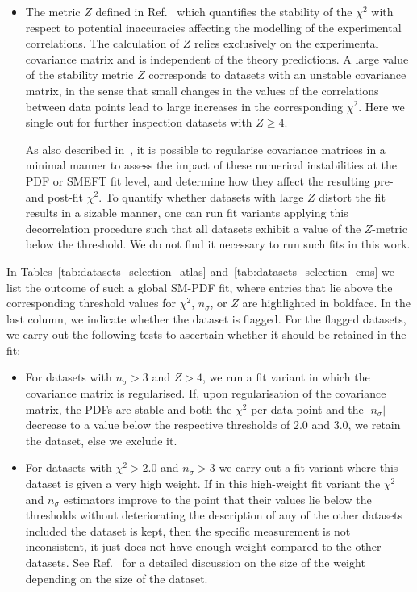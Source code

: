 \documentclass[withindex,glossary]{cam-thesis}
\begin{document}
\begin{itemize}
%
\item The metric $Z$ defined in Ref.~\cite{Kassabov:2022pps} which
quantifies the stability of the $\chi^2$ with respect
to potential inaccuracies affecting the modelling of the experimental correlations.
%
The calculation of $Z$ relies  exclusively on the experimental covariance matrix
and is independent of the theory predictions.
%
A large value of the stability metric $Z$ corresponds to
datasets with an unstable covariance matrix, in the sense that small changes
in the values of the correlations between data points lead to large
increases in the corresponding $\chi^2$.
%
Here we single out for further inspection  datasets with $Z\ge 4$.

As also described in~\cite{Kassabov:2022pps}, it is possible to regularise
covariance matrices in a minimal manner to assess the impact of these numerical
instabilities at the PDF or SMEFT fit level, and determine how
they affect the resulting pre- and post-fit $\chi^2$.
%
To quantify whether datasets with large $Z$ distort the fit results in a sizable
manner, one can run fit variants applying this decorrelation procedure such that all datasets
exhibit a value of the $Z$-metric below the threshold. We do not find it necessary
to run such fits in this work.

\end{itemize}

\noindent
In  Tables~\ref{tab:datasets_selection_atlas} and~\ref{tab:datasets_selection_cms}
we list the outcome of such a global SM-PDF fit, where entries that lie above the corresponding threshold values for $\chi^2$, $n_{\sigma}$, or $Z$ are highlighted in boldface.
%
In the last column, we indicate whether the dataset is flagged.
%
For the flagged datasets, we carry out the following tests to ascertain whether
it should be retained in the fit:

\begin{itemize}

\item For datasets with  $n_\sigma> 3$ and $Z>4$,  we run a fit variant in which the covariance matrix is regularised.
%
  If, upon regularisation of the covariance matrix, the PDFs are
  stable and both the $\chi^2$ per data point and the $|n_\sigma|$ decrease to a value below the
  respective thresholds of 2.0 and 3.0, we retain the dataset, else we exclude it.

\item For datasets with $\chi^2>2.0$ and $n_\sigma>3$ we carry out a fit variant
  where this dataset is given a very high weight.
  If in this high-weight fit variant the $\chi^2$ and $n_\sigma$ estimators
  improve to the point that their values lie below the thresholds  without
  deteriorating the description of any of the other datasets included
  the dataset is kept, then the specific measurement is not
  inconsistent, it just does not have enough weight compared to the
  other datasets. See Ref.~\cite{NNPDF:2021njg} for a detailed
  discussion on the size of the weight depending on the size of the
  dataset. 
\end{itemize}
\end{document}
